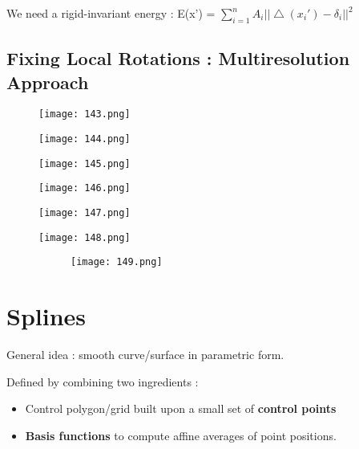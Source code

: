\documentclass{article}
\begin{document}
We need a rigid-invariant energy : E(x') = $\sum_{i=1}^n A_i ||\bigtriangleup (x_i') - \delta_i ||^2$


\subsection{Fixing Local Rotations : Multiresolution Approach}

\begin{figure}[!htb]
  \texttt{[image: 143.png]}
  
\endminipage\hfill
{}
  \texttt{[image: 144.png]}
  
\endminipage\hfill
{}%
  \texttt{[image: 145.png]}

  
\endminipage
\end{figure}


\begin{figure}[!htb]
  \texttt{[image: 146.png]}
  
\endminipage\hfill
{}
  \texttt{[image: 147.png]}
  
\endminipage\hfill
{}%
  \texttt{[image: 148.png]}

  
\endminipage
\end{figure}

    \begin{figure}[ht!]
  \centering
  \begin{subfigure}[b]{0.4\linewidth}
    \texttt{[image: 149.png]}
  \end{subfigure}
\end{figure}

\vspace{30mm}

\section{Splines}

General idea : smooth curve/surface in parametric form.

Defined by combining two ingredients : 

\begin{itemize}
    \item Control polygon/grid built upon a small set of \textbf{control points}
    \item \textbf{Basis functions} to compute affine averages of point positions.
\end{itemize}
\end{document}
